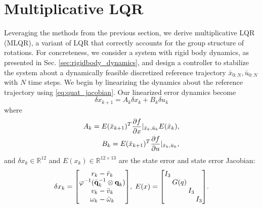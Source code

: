 \documentclass[letterpaper, 10 pt, conference]{ieeeconf}  %
\newcommand{\R}{\mathbb{R}}
\newcommand{\q}{\textbf{q}}
\begin{document}
\section{Multiplicative LQR} \label{sec:MLQR}
    Leveraging the methods from the previous section, we derive multiplicative LQR
    (MLQR), a variant of LQR that correctly accounts for the group structure of
    rotations. For concreteness, we consider a system with rigid body dynamics, as
    presented in Sec. \ref{sec:rigidbody_dynamics}, and design a controller to stabilize
    the system about a dynamically feasible discretized reference trajectory
    $\bar{x}_{0:N}, \bar{u}_{0:N}$ with $N$ time steps.
    We begin by linearizing the dynamics about the reference trajectory using \eqref{eq:quat_jacobian}. Our linearized error dynamics become
    \begin{equation} \label{eq:linearized_dynamics}
        \delta x_{k+1} = A_k \delta x_k + B_k \delta u_k 
    \end{equation}
    where \begin{equation}
        \begin{aligned}
            A_k = E(\bar{x}_{k+1})^T \pdv{f}{x}|_{\bar{x}_k,\bar{u}_k} E(\bar{x}_k), \\
            B_k = E(\bar{x}_{k+1})^T \pdv{f}{u}|_{\bar{x}_k,\bar{u}_k},
        \end{aligned}
    \end{equation}
    and $\delta x_k \in \R^{12}$ and $E(x_k) \in \R^{12 \times 13}$ are the state error and state error Jacobian:
    \begin{equation} \label{eq:state_error}
        \setlength\arraycolsep{1pt}
        \delta x_k = \begin{bmatrix} 
            r_k - \bar{r}_k \\ \varphi^{-1}(\bar{\q}_k^{-1} \otimes \q_k) \\ v_k - \bar{v}_k \\ \omega_k - \bar{\omega}_k 
        \end{bmatrix}\!, \;
        E(x) = \begin{bmatrix}
            I_3 & & & \\
            & G(q) & & \\
            & & I_3 & \\
            & & & I_3 \\
        \end{bmatrix}\!.
    \end{equation}
    
\end{document}
